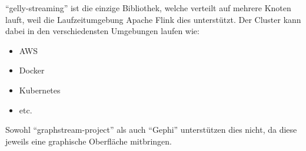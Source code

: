 \enquote{gelly-streaming} ist die einzige Bibliothek, welche verteilt auf mehrere
Knoten lauft, weil die Laufzeitumgebung Apache Flink dies unterstützt.
Der Cluster kann dabei in den verschiedensten Umgebungen laufen wie: \cite{Foundation2018}

\begin{itemize}
\item AWS
\item Docker
\item Kubernetes
\item etc.
\end{itemize}

Sowohl \enquote{graphstream-project} als auch \enquote{Gephi} unterstützen dies
nicht, da diese jeweils eine graphische Oberfläche mitbringen.
